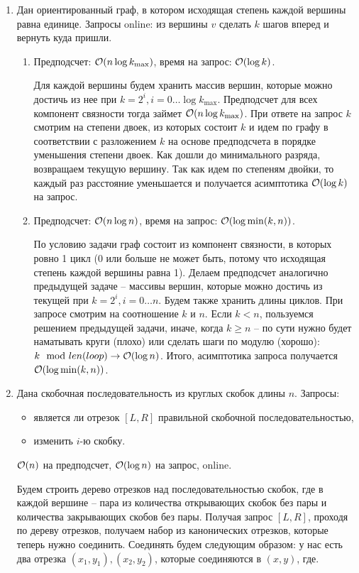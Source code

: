 \begin{enumerate}
  \item
    Дан ориентированный граф, в котором исходящая степень каждой вершины
	равна единице. Запросы online: из вершины $v$ сделать $k$ шагов вперед и вернуть куда пришли.
	\begin{enumerate}
	  \item Предподсчет: $\mathcal{O}(n \log k_{\max})$, время на запрос: $\mathcal{O}(\log k)$.
	  \begin{solution}
		Для каждой вершины будем хранить массив вершин, которые можно достичь из нее при $k=2^i, i = 0 \ldots \log k_{\max}$. Предподсчет для всех компонент связности тогда займет $\mathcal{O}(n \log k_{\max})$. При ответе на запрос $k$ смотрим на степени двоек, из которых состоит $k$ и идем по графу в соответствии с разложением $k$ на основе предподсчета в порядке уменьшения степени двоек. Как дошли до минимального разряда, возвращаем текущую вершину. Так как идем по степеням двойки, то каждый раз расстояние уменьшается и получается асимптотика $\mathcal{O}(\log k)$ на запрос.
	  \end{solution}
	  \item Предподсчет: $\mathcal{O}(n \log n)$, время на запрос: $\mathcal{O}(\log \min(k, n))$.      
	  \begin{solution}
		По условию задачи граф состоит из компонент связности, в которых ровно 1 цикл (0 или больше не может быть, потому что исходящая степень каждой вершины равна 1). Делаем предподсчет аналогично предыдущей задаче -- массивы вершин, которые можно достичь из текущей при $k=2^i, i = 0 \ldots n$. Будем также хранить длины циклов. При запросе смотрим на соотношение $k$ и $n$. Если $k < n$, пользуемся решением предыдущей задачи, иначе, когда $k \geq n$ -- по сути нужно будет наматывать круги (плохо) или сделать шаги по модулю (хорошо): $k \mod len(loop) \rightarrow \mathcal{O}(\log n)$. Итого, асимптотика запроса получается $\mathcal{O}(\log \min(k, n))$.
	  \end{solution}
	\end{enumerate}
	
  \item
	Дана скобочная последовательность из круглых скобок длины $n$. Запросы:
	\begin{itemize}
	    \item является ли отрезок $[L, R]$ правильной скобочной последовательностью,
	    \item изменить $i$-ю скобку.
	\end{itemize}
	$\mathcal{O}(n)$ на предподсчет, $\mathcal{O}(\log n)$ на запрос, online.
	\begin{solution}
		Будем строить дерево отрезков над последовательностью скобок, где в каждой вершине -- пара из количества открывающих скобок без пары и количества закрывающих скобов без пары. Получая запрос $[L, R]$, проходя по дереву отрезков, получаем набор из канонических отрезков, которые теперь нужно соединить. Соединять будем следующим образом: у нас есть два отрезка $(x_1, y_1), (x_2, y_2)$, которые соединяются в $(x, y)$, где. 


\end{solution}
\end{enumerate}
